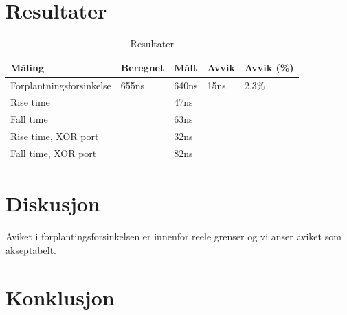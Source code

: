 \documentclass{article}
\begin{document}
\section{Resultater}
\begin{table}[h]
	\centering
	\caption{Resultater}
	\label{my-label}
	\vspace{0.2cm}
	\begin{tabular}{| l | l | l | l | l |} \hline
	Måling & Beregnet & Målt & Avvik & Avvik (\%) \\ \hline
	Forplantningsforsinkelse & 655ns             & 640ns         & 15ns          & 2.3\%              \\ \hline
	Rise time                &                   & 47ns          &               &                    \\ \hline
	Fall time                &                   & 63ns          &               &                    \\ \hline
	Rise time, XOR port      &                   & 32ns          &               &                    \\ \hline
	Fall time, XOR port      &                   & 82ns          &               & 				   \\ \hline
	\end{tabular}
\end{table}

\section{Diskusjon}
Aviket i forplantingsforsinkelsen er innenfor reele grenser og vi anser aviket som akseptabelt.

\section{Konklusjon}

\newpage
\end{document}
